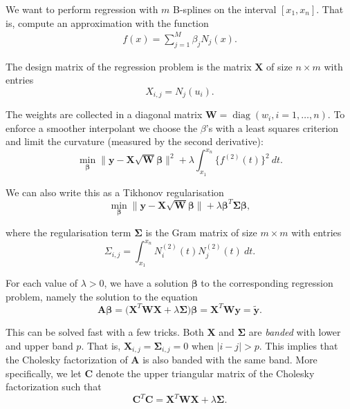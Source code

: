 \documentclass[a4paper]{scrartcl}
\newcommand{\vv}[1]{\ensuremath{\bm{#1}}}
\newcommand{\mat}[1]{\ensuremath{\bm{#1}}}
\newcommand{\T}[1]{\ensuremath{{#1}^{T}}}
\newcommand\dd{\ensuremath{\:d}}
\DeclareMathOperator\diag{diag}
\begin{document}
We want to perform regression with $m$ B-splines on the interval $[x_1, x_n]$.
That is, compute an approximation with the function
\begin{align*}
    f(x) = \sum_{j=1}^M \beta_j N_j(x).
\end{align*}

The design matrix of the regression problem is the matrix $\mat X$ of size $n\times m$ with entries
\begin{equation*}
    X_{i,j} = N_j(u_i).
\end{equation*}

The weights are collected in a diagonal matrix $\mat W = \diag(w_i, i = 1, \ldots, n)$.
To enforce a smoother interpolant we choose the $\beta$'s with a least squares criterion and limit the curvature (measured by the second derivative):
\begin{equation*}
    \min_{\vv \beta} \|\vv y - \mat X \sqrt{\mat W} \vv \beta\|^2 + \lambda \int_{x_1}^{x_n} \bigl\{f^{(2)}(t)\bigr\}^2 \dd t.
\end{equation*}

We can also write this as a Tikhonov regularisation
\begin{equation*}
    \min_{\vv \beta} \|\vv y - \mat X \sqrt{\mat W} \vv \beta\| + \lambda \T{\vv\beta} \mat\Sigma \vv\beta,
\end{equation*}

where the regularisation term $\mat\Sigma$ is the Gram matrix of size $m\times m$ with entries
\begin{equation*}
    \Sigma_{i,j} =
    \int_{x_1}^{x_n} N_i^{(2)}(t) N_j^{(2)}(t) \dd t.
\end{equation*}

For each value of $\lambda > 0$, we have a solution $\vv\beta$ to the corresponding regression problem, namely the solution to the equation
\begin{equation}
    \label{eq:normal_equation}
    \mat A \vv \beta
    = \bigl(\T{\mat X} \mat W \mat X + \lambda \mat\Sigma\bigr) \vv\beta
    = \T{\mat X} \mat W \vv y 
    = \widetilde{\vv y}.
\end{equation}

This can be solved fast with a few tricks.
Both $\mat X$ and $\mat\Sigma$ are \textit{banded} with lower and upper band $p$.
That is, $\mat X_{i,j} = \mat\Sigma_{i,j} = 0$ when $|i - j| > p$.
This implies that the Cholesky factorization of $\mat A$ is also banded with the same band.
More specifically, we let $\mat C$ denote the upper triangular matrix of the Cholesky factorization such that 
\begin{equation*}
    \T{\mat C} \mat C = \T{\mat X} \mat W \mat X + \lambda \mat\Sigma.
\end{equation*}
\end{document}

